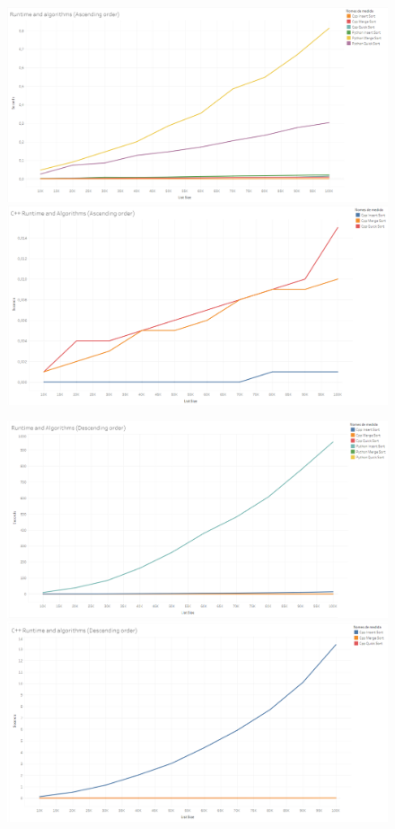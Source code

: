 \documentclass{article}
\begin{document}
	\begin{figure}[!h]
		\centering
		\includegraphics[scale=0.3]{images/runtime_ALL-ascending.png}
		\includegraphics[scale=0.3]{images/runtime_cppONLY-ascending.png}		
	\end{figure}
	
	\begin{figure}[!h]
		\centering
		\includegraphics[scale=0.3]{images/runtime_ALL-descending.png}
		\includegraphics[scale=0.3]{images/runtime_cppONLY-descending.png}
	\end{figure}
	
\end{document}
